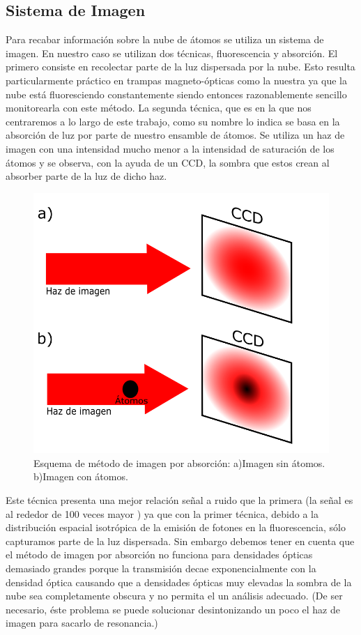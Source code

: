 \documentclass[12pt,twoside]{article}
\begin{document}
\subsection{Sistema de Imagen}\label{absorcion}

Para recabar información sobre la nube de átomos se utiliza un sistema de imagen. En nuestro caso se utilizan dos técnicas, fluorescencia y absorción. 
El primero consiste en recolectar parte de la luz dispersada por la nube. Esto resulta particularmente práctico en trampas magneto-ópticas como la nuestra ya que la nube está fluoresciendo constantemente siendo entonces razonablemente sencillo monitorearla con este método. La segunda técnica, que es en la que nos centraremos a lo largo de este trabajo, como su nombre lo indica se basa en la absorción de luz por parte de nuestro ensamble de átomos. Se utiliza un haz de imagen con una intensidad mucho menor a la intensidad de saturación de los átomos y se observa, con la ayuda de un CCD, la sombra que estos crean al absorber parte de la luz de dicho haz.

\begin{figure}[h] 
    \begin{center}
        \includegraphics[width=0.6\linewidth]{esqabs.png}
    \end{center}
    \caption{Esquema de método de imagen por absorción: a)Imagen sin átomos. b)Imagen con átomos. }
    \label{esqimgabs}
\end{figure}
Este técnica presenta una mejor relación señal a ruido que la primera (la señal es al rededor de 100 veces mayor \cite{Gordon2009}) ya que con la primer técnica, debido a la distribución espacial isotrópica de la emisión de fotones en la fluorescencia, sólo capturamos parte de la luz dispersada. Sin embargo debemos tener en cuenta que el método de imagen por absorción no funciona para densidades ópticas demasiado grandes porque la transmisión decae exponencialmente con la densidad óptica causando que a densidades ópticas muy elevadas la sombra de la nube sea completamente obscura y no permita el un análisis adecuado. (De ser necesario, éste problema se puede solucionar desintonizando un poco el haz de imagen para sacarlo de resonancia.)
\end{document}
